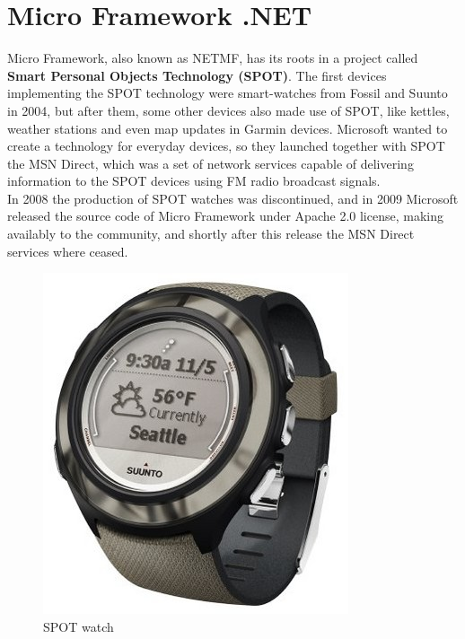 \section{Micro Framework .NET}\label{S:SOTA-NETMF}
Micro Framework, also known as NETMF, has its roots in a project called \textbf{Smart Personal Objects Technology (SPOT)}. The first devices implementing the SPOT technology were smart-watches from Fossil and Suunto in 2004, but after them, some other devices also made use of SPOT, like kettles, weather stations and even map updates in Garmin devices. Microsoft wanted to create a technology for everyday devices, so they launched together with SPOT the MSN Direct, which was a set of network services capable of delivering information to the SPOT devices using FM radio broadcast signals.
\\
In 2008 the production of SPOT watches was discontinued, and in 2009 Microsoft released the source code of Micro Framework under Apache 2.0 license, making availably to the community, and shortly after this release the MSN Direct services where ceased.
\begin{figure}[H]\begin{center}
 \centering
  \captionsetup{justification=centering}
 \includegraphics[scale=1]{pictures/stateoftheart/spot}
  \caption{SPOT watch \label{fig:State-Art-SPOT-Watch}}
\end{center}\end{figure}

